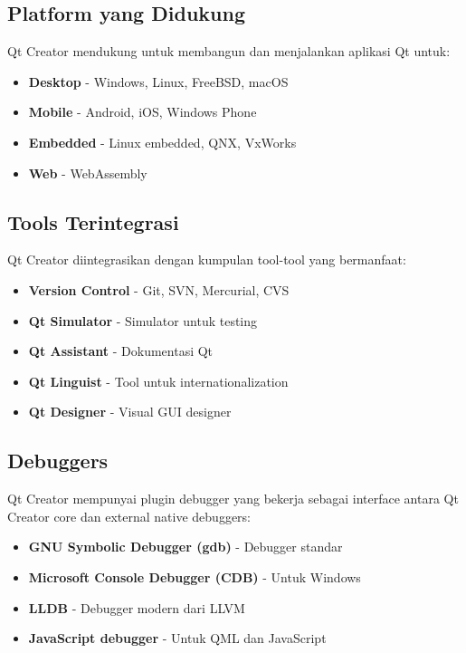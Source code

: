 \subsection{Platform yang Didukung}

Qt Creator mendukung untuk membangun dan menjalankan aplikasi Qt untuk:

\begin{itemize}
\item \textbf{Desktop} - Windows, Linux, FreeBSD, macOS
\item \textbf{Mobile} - Android, iOS, Windows Phone
\item \textbf{Embedded} - Linux embedded, QNX, VxWorks
\item \textbf{Web} - WebAssembly
\end{itemize}

\subsection{Tools Terintegrasi}

Qt Creator diintegrasikan dengan kumpulan tool-tool yang bermanfaat:

\begin{itemize}
\item \textbf{Version Control} - Git, SVN, Mercurial, CVS
\item \textbf{Qt Simulator} - Simulator untuk testing
\item \textbf{Qt Assistant} - Dokumentasi Qt
\item \textbf{Qt Linguist} - Tool untuk internationalization
\item \textbf{Qt Designer} - Visual GUI designer
\end{itemize}

\subsection{Debuggers}

Qt Creator mempunyai plugin debugger yang bekerja sebagai interface antara Qt Creator core dan external native debuggers:

\begin{itemize}
\item \textbf{GNU Symbolic Debugger (gdb)} - Debugger standar
\item \textbf{Microsoft Console Debugger (CDB)} - Untuk Windows
\item \textbf{LLDB} - Debugger modern dari LLVM
\item \textbf{JavaScript debugger} - Untuk QML dan JavaScript
\end{itemize}

